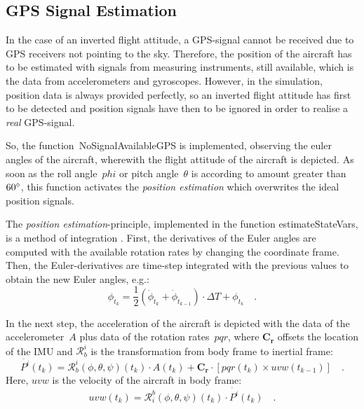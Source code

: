 \documentclass[11pt,a4paper]{scrartcl}		%
\begin{document}
\medskip






\subsection{GPS Signal Estimation}

In the case of an inverted flight attitude, a GPS-signal cannot be received due to GPS receivers not pointing to the sky.
Therefore, the position of the aircraft has to be estimated with signals from measuring instruments, still available, which is the data from accelerometers and gyroscopes.
However, in the simulation, position data is always provided perfectly, so an inverted flight attitude has first to be detected and position signals have then to be ignored in order to realise a \textsl{real} GPS-signal.

\smallskip

So, the function~\textsf{NoSignalAvailableGPS} is implemented, observing the euler angles of the aircraft, wherewith the flight attitude of the aircraft is depicted.
As soon as the roll angle~$phi$ or pitch angle~$\theta$ is according to amount greater than $60\degree$, this function activates the \textsl{position estimation} which overwrites the ideal position signals.

\smallskip

The \textsl{position estimation}-principle, implemented in the function \textsf{estimateStateVars}, is a method of integration \cite{Dantsker.2016}.
First, the derivatives of the Euler angles are computed with the available rotation rates by changing the coordinate frame. 
Then, the Euler-derivatives are time-step integrated with the previous values to obtain the new Euler angles, e.g.:
\begin{equation}\label{eq-integration}
 \phi_{t_k} = \frac{1}{2}(\dot{\phi}_{t_k}+\dot{\phi}_{t_{k-1}})\cdot \Delta T + \phi_{t_k} \quad .
\end{equation}

In the next step, the acceleration of the aircraft is depicted with the data of the accelerometer~$A$ plus data of the rotation rates~$pqr$, where $\mathbf{C_r}$ offsets the location of the IMU and $\mathcal{R}_b^i$ is the transformation from body frame to inertial frame:
\begin{equation}
\ddot{P^i}(t_k)= \mathcal{R}_b^i(\phi,\theta,\psi)(t_k)\cdot A(t_k) + \mathbf{C_r} \cdot \left[ pqr(t_k) \times uvw(t_{k-1})\right] \quad .
\end{equation}
Here, $uvw$ is the velocity of the aircraft in body frame:
\begin{equation}
uvw(t_k) = \mathcal{R}_i^b(\phi,\theta,\psi)(t_k) \cdot \dot{P^i}(t_k) \quad .
\end{equation}
\end{document}
